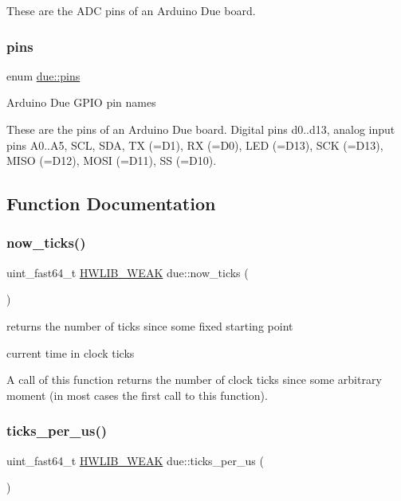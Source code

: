 These are the A\+DC pins of an Arduino Due board. \mbox{\label{namespacedue_a8ffa3ec309934ff9db34317e504bcc92}} 
\subsubsection{\texorpdfstring{pins}{pins}}
{\footnotesize\ttfamily enum \hyperlink{namespacedue_a8ffa3ec309934ff9db34317e504bcc92}{due\+::pins}\hspace{0.3cm}{\ttfamily [strong]}}

Arduino Due G\+P\+IO pin names

These are the pins of an Arduino Due board. Digital pins d0..d13, analog input pins A0..A5, S\+CL, S\+DA, TX (=D1), RX (=D0), L\+ED (=D13), S\+CK (=D13), M\+I\+SO (=D12), M\+O\+SI (=D11), SS (=D10). 

\subsection{Function Documentation}
\mbox{\label{namespacedue_a686106c53be24f799ee7313069a678be}} 
\subsubsection{\texorpdfstring{now\+\_\+ticks()}{now\_ticks()}}
{\footnotesize\ttfamily uint\+\_\+fast64\+\_\+t \hyperlink{hwlib-defines_8hpp_a04be4340016df60d6636c1d1c6d94fc9}{H\+W\+L\+I\+B\+\_\+\+W\+E\+AK} due\+::now\+\_\+ticks (\begin{DoxyParamCaption}{ }\end{DoxyParamCaption})}



returns the number of ticks since some fixed starting point 

current time in clock ticks

A call of this function returns the number of clock ticks since some arbitrary moment (in most cases the first call to this function). \mbox{\label{namespacedue_aa7b4a4a4dffe3296d13e465cc3d78a62}} 
\subsubsection{\texorpdfstring{ticks\+\_\+per\+\_\+us()}{ticks\_per\_us()}}
{\footnotesize\ttfamily uint\+\_\+fast64\+\_\+t \hyperlink{hwlib-defines_8hpp_a04be4340016df60d6636c1d1c6d94fc9}{H\+W\+L\+I\+B\+\_\+\+W\+E\+AK} due\+::ticks\+\_\+per\+\_\+us (\begin{DoxyParamCaption}{ }\end{DoxyParamCaption})}




